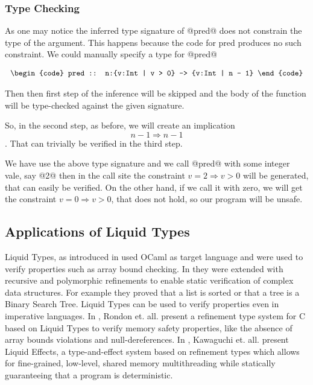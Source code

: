 \subsubsection{Type Checking}
As one may notice the inferred type signature of @pred@ does not constrain the type of the argument.
This happens because the code for pred produces no such constraint.
We could manually specify a type for @pred@

$$\centering
\begin{tabular}{c}
\begin{code}
pred :: n:{v:Int | v > 0} -> {v:Int | n - 1}
\end{code}
\end{tabular}
$$

Then then first step of the inference will be skipped and the 
body of the function will be type-checked against the given signature.

So, in the second step, as before, we will create an implication
$$n-1 \Rightarrow n - 1 $$. That can trivially be verified in the third step.

We have use the above type signature and we call @pred@ with some integer vale, say @2@
then in the call site the constraint $v = 2 \Rightarrow v >0$ will be generated, 
that can easily be verified.
%
On the other hand, if we call it with zero, we will get the constraint
$v = 0 \Rightarrow v >0$, that does not hold, 
so our program will be unsafe.

\subsection{Applications of Liquid Types}

Liquid Types, as introduced in \cite{LiquidPLDI08} used OCaml as target language
and were used to verify properties such as array bound checking.
In \cite{LiquidPLDI09} they were extended with recursive and polymorphic refinements
to enable static verification of complex data structures. For example they proved
that a list is sorted or that a tree is a Binary Search Tree.
%
Liquid Types can be used to verify properties even in imperative languages.
In \cite{Rondon10}, Rondon et. all. present a refinement type system for
C based on Liquid Types to verify memory safety properties, 
like the absence of array bounds violations
and null-dereferences.
In \cite{Kawaguchi12},
Kawaguchi et. all. present Liquid Effects, a type-and-effect system based on refinement types
which allows for fine-grained, low-level, shared memory multithreading while statically guaranteeing that a program is deterministic. 

